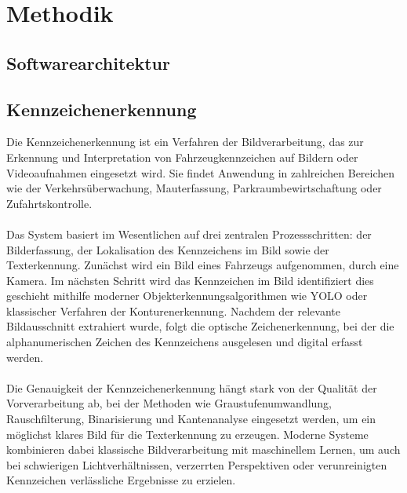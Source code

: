 \section{Methodik}
\subsection{Softwarearchitektur}
\subsection{Kennzeichenerkennung}
Die Kennzeichenerkennung ist ein Verfahren der Bildverarbeitung, das zur Erkennung und Interpretation von Fahrzeugkennzeichen auf Bildern oder Videoaufnahmen eingesetzt wird. Sie findet Anwendung in zahlreichen Bereichen wie der Verkehrsüberwachung, Mauterfassung, Parkraumbewirtschaftung oder Zufahrtskontrolle.\\\\
Das System basiert im Wesentlichen auf drei zentralen Prozessschritten: der Bilderfassung, der Lokalisation des Kennzeichens im Bild sowie der Texterkennung. Zunächst wird ein Bild eines Fahrzeugs aufgenommen, durch eine Kamera. Im nächsten Schritt wird das Kennzeichen im Bild identifiziert dies geschieht mithilfe moderner Objekterkennungsalgorithmen wie YOLO oder klassischer Verfahren der Konturenerkennung. Nachdem der relevante Bildausschnitt extrahiert wurde, folgt die optische Zeichenerkennung, bei der die alphanumerischen Zeichen des Kennzeichens ausgelesen und digital erfasst werden.\\\\
Die Genauigkeit der Kennzeichenerkennung hängt stark von der Qualität der Vorverarbeitung ab, bei der Methoden wie Graustufenumwandlung, Rauschfilterung, Binarisierung und Kantenanalyse eingesetzt werden, um ein möglichst klares Bild für die Texterkennung zu erzeugen. Moderne Systeme kombinieren dabei klassische Bildverarbeitung mit maschinellem Lernen, um auch bei schwierigen Lichtverhältnissen, verzerrten Perspektiven oder verunreinigten Kennzeichen verlässliche Ergebnisse zu erzielen.

